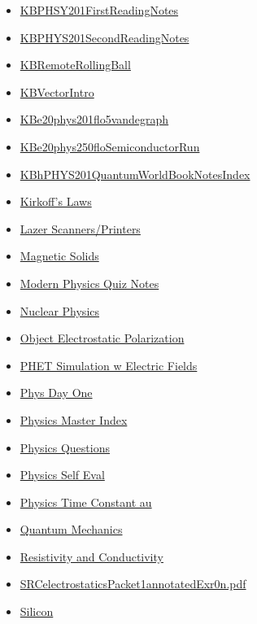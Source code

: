 \documentclass[11pt]{article}
\begin{document}
\begin{itemize}
\begin{itemize}
\item \href{phys201/KBPHSY201FirstReadingNotes.org}{KBPHSY201FirstReadingNotes}
\item \href{phys201/KBPHYS201SecondReadingNotes.org}{KBPHYS201SecondReadingNotes}
\item \href{phys201/KBRemoteRollingBall.org}{KBRemoteRollingBall}
\item \href{phys201/KBVectorIntro.org}{KBVectorIntro}
\item \href{phys201/KBe20phys201flo5vandegraph.org}{KBe20phys201flo5vandegraph}
\item \href{phys201/KBe20phys250floSemiconductorRun.org}{KBe20phys250floSemiconductorRun}
\item \href{phys201/KBhPHYS201QuantumWorldBookNotesIndex.org}{KBhPHYS201QuantumWorldBookNotesIndex}
\item \href{phys201/KBhPHYS201KirkoffsLaws.org}{Kirkoff's Laws}
\item \href{phys201/KBhPHYS201LazerPrinters.org}{Lazer Scanners/Printers}
\item \href{phys201/KBhPHYS201MagneticSolids.org}{Magnetic Solids}
\item \href{phys201/KBPHYS201ZachsPhysicsNotesForTest.org}{Modern Physics Quiz Notes}
\item \href{phys201/KBhPHYS201NuclearPhysics.org}{Nuclear Physics}
\item \href{phys201/KBhPHYS201ElectrostaticPolarization.org}{Object Electrostatic Polarization}
\item \href{phys201/KBhPHYS201PHETElectricFields.org}{PHET Simulation w Electric Fields}
\item \href{phys201/KB20200825090600.org}{Phys Day One}
\item \href{phys201/KBPhysicsMasterIndex.org}{Physics Master Index}
\item \href{phys201/physQuestions.org}{Physics Questions}
\item \href{phys201/KBxPhysSelvEval2020.org}{Physics Self Eval}
\item \href{phys201/KBrefPhysTimeConstant.org}{Physics Time Constant au}
\item \href{phys201/KBhPHYS201QuantumMechanics.org}{Quantum Mechanics}
\item \href{phys201/KBhPHYS201ResistanceConductivity.org}{Resistivity and Conductivity}
\item \href{phys201/SRCelectrostaticsPacket1annotatedExr0n.pdf.org}{SRCelectrostaticsPacket1annotatedExr0n.pdf}
\item \href{phys201/KBhPHYS201Silicon.org}{Silicon}

\end{itemize}
\end{itemize}
\end{document}
